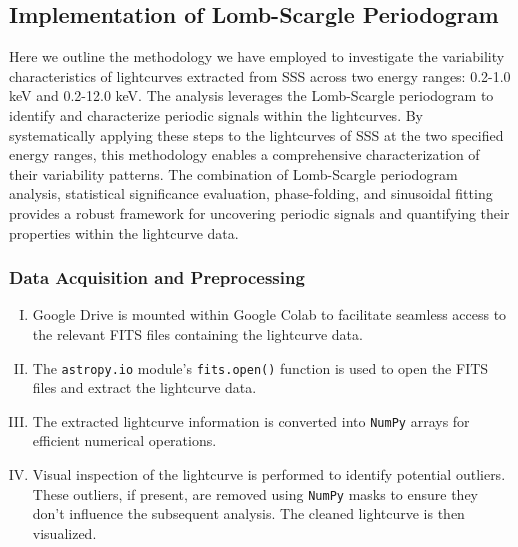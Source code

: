     	\subsection{Implementation of Lomb-Scargle Periodogram}
    		Here we outline the methodology we have employed to investigate the variability characteristics of lightcurves extracted from SSS across two energy ranges: 0.2-1.0 keV and 0.2-12.0 keV. The analysis leverages the Lomb-Scargle periodogram to identify and characterize periodic signals within the lightcurves. By systematically applying these steps to the lightcurves of SSS at the two specified energy ranges, this methodology enables a comprehensive characterization of their variability patterns. The combination of Lomb-Scargle periodogram analysis, statistical significance evaluation, phase-folding, and sinusoidal fitting provides a robust framework for uncovering periodic signals and quantifying their properties within the lightcurve data.
    		    	
    		\subsubsection{Data Acquisition and Preprocessing}
    			\begin{enumerate}[I.]
    				\item Google Drive is mounted within Google Colab to facilitate seamless access to the relevant FITS files containing the lightcurve data.
    				\item The \texttt{astropy.io} module's \texttt{fits.open()} function is used to open the FITS files and extract the lightcurve data.
    				\item The extracted lightcurve information is converted into \texttt{NumPy} arrays for efficient numerical operations.
    				\item Visual inspection of the lightcurve is performed to identify potential outliers. These outliers, if present, are removed using \texttt{NumPy} masks to ensure they don't influence the subsequent analysis. The cleaned lightcurve is then visualized.
    			\end{enumerate}
    		
